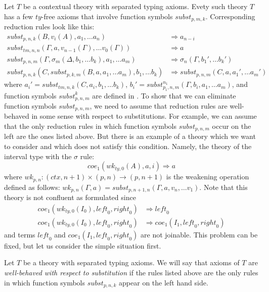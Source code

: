 \documentclass[reqno]{amsart}
\theoremstyle{definition}
\theoremstyle{remark}
\newcommand{\leftI}{\mathit{left}}
\newcommand{\rightI}{\mathit{right}}
\newcommand{\coe}{\mathit{coe}}
\newcommand{\subst}{\mathit{subst}}
\newcommand{\wk}{\mathit{wk}}
\newcommand{\ty}{\mathit{ty}}
\newcommand{\ctx}{\mathit{ctx}}
\newcommand{\tm}{\mathit{tm}}
\numberwithin{figure}{section}
\begin{document}
Let $T$ be a contextual theory with separated typing axioms.
Evety such theory $T$ has a few $\ty$-free axioms that involve function symbols $\subst_{p,m,k}$.
Corresponding reduction rules look like this:
\begin{align*}
\subst_{p,n,k}(B, v_i(A), a_1, \ldots a_n) & \Rightarrow a_{n-i} \\
\subst_{\tm,n,n}(\Gamma, a, v_{n-1}(\Gamma), \ldots v_0(\Gamma)) & \Rightarrow a \\
\subst_{p,n,m}(\Gamma, \sigma_m(\Delta, b_1, \ldots b_k), a_1, \ldots a_m) & \Rightarrow \sigma_n(\Gamma, b_1', \ldots b_k') \\
\subst_{p,n,k}(C, \subst_{p,k,m}(B, a, a_1, \ldots a_m), b_1, \ldots b_k) & \Rightarrow \subst_{p,n,m}(C, a, a_1', \ldots a_m')
\end{align*}
where $a_i' = \subst_{\tm,n,k}(C, a_i, b_1, \ldots b_k)$, $b_i' = \subst^{n_1}_{p_1,n,m}(\Gamma, b_i, a_1, \ldots a_m)$,
and function symbols $\subst^k_{p,n,m}$ are defined in \cite[Subsection~4.3]{alg-tt}.
To show that we can eliminate function symbols $\subst_{p,n,m}$, we need to assume that reduction rules are well-behaved in some sense with respect to substitutions.
For example, we can assume that the only reduction rules in which function symbols $\subst_{p,n,m}$ occur on the left are the ones listed above.
But there is an example of a theory which we want to consider and which does not satisfy this condition.
Namely, the theory of the interval type with the $\sigma$ rule:
\[ \coe_1(\wk_{\ty,0}(A), a, i) \Rightarrow a \]
where $\wk_{p,n} : (\ctx,n+1) \times (p,n) \to (p,n+1)$ is the weakening operation defined as follows: $\wk_{p,n}(\Gamma,a) = \subst_{p,n+1,n}(\Gamma, a, v_n, \ldots v_1)$.
Note that this theory is not confluent as formulated since
\begin{align*}
\coe_1(\wk_{\ty,0}(I_0), \leftI_0, \rightI_0) & \Rightarrow \leftI_0 \\
\coe_1(\wk_{\ty,0}(I_0), \leftI_0, \rightI_0) & \Rightarrow \coe_1(I_1, \leftI_0, \rightI_0)
\end{align*}
and terms $\leftI_0$ and $\coe_1(I_1, \leftI_0, \rightI_0)$ are not joinable.
This problem can be fixed, but let us consider the simple situation first.

\begin{defn}
Let $T$ be a theory with separated typing axioms.
We will say that axioms of $T$ are \emph{well-behaved with respect to substitution} if the rules listed above are the only rules
in which function symbols $\subst_{p,n,k}$ appear on the left hand side.
\end{defn}
\end{document}
